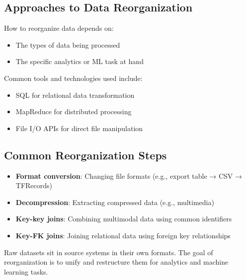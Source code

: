 \documentclass[12pt]{article}
\begin{document}
\subsection{Approaches to Data Reorganization}

\begin{tcolorbox}[colback=yellow!5!white,colframe=yellow!75!black,title={Key Insight}]
How to reorganize data depends on:
\begin{itemize}
    \item The types of data being processed
    \item The specific analytics or ML task at hand
\end{itemize}

Common tools and technologies used include:
\begin{itemize}
    \item SQL for relational data transformation
    \item MapReduce for distributed processing
    \item File I/O APIs for direct file manipulation
\end{itemize}
\end{tcolorbox}

\subsection{Common Reorganization Steps}

\begin{tcolorbox}[colback=blue!5!white,colframe=blue!75!black,title={Common Steps in Data Reorganization}]
\begin{itemize}
    \item \textbf{Format conversion}: Changing file formats (e.g., export table → CSV → TFRecords)
    \item \textbf{Decompression}: Extracting compressed data (e.g., multimedia)
    \item \textbf{Key-key joins}: Combining multimodal data using common identifiers
    \item \textbf{Key-FK joins}: Joining relational data using foreign key relationships
\end{itemize}
\end{tcolorbox}

\begin{tcolorbox}[colback=yellow!5!white,colframe=yellow!75!black,title={Fundamental Challenge}]
Raw datasets sit in source systems in their own formats. The goal of reorganization is to unify and restructure them for analytics and machine learning tasks.
\end{tcolorbox}
\end{document}
